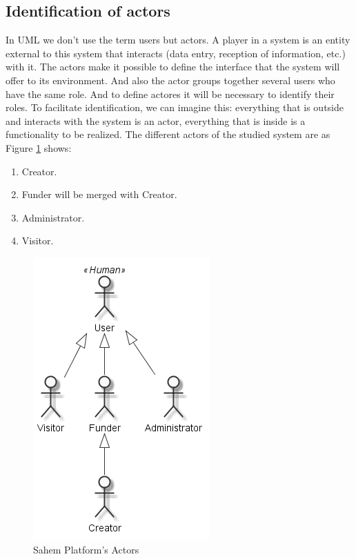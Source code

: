 \subsection{Identification of actors}
In UML we don't use the term users but actors. A player in a system is an entity external to this system that interacts (data entry, reception of information, etc.) with it. The actors make it possible to define the interface that the system will offer to its environment. And also the actor groups together several users who have the same role. And to define actores it will be necessary to identify their roles.
To facilitate identification, we can imagine this: everything that is outside and interacts with the system is an actor, everything that is inside is a functionality to be realized.
The different actors of the studied system are as Figure \ref{fig:sahemactors} shows:

\begin{enumerate}
    \item  Creator.
    \item  Funder will be merged with Creator.
    \item  Administrator.
    \item  Visitor.
\end{enumerate}

\begin{figure}[!ht]
      \centering
      \includegraphics[scale=0.6]{assets/Actors.png}
      \caption{Sahem Platform's Actors}
      \label{fig:sahemactors}
\end{figure}
